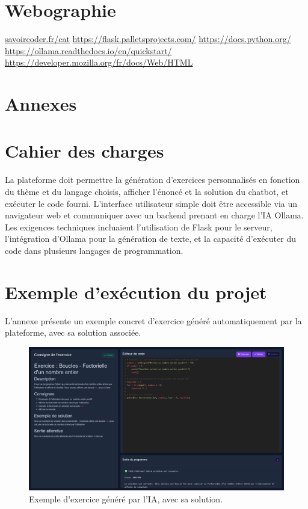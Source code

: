\documentclass[a4paper, 12pt, twoside]{article}
\begin{document}
\newpage
\section{Webographie}
\begin{thebibliography}{2}
 \url{savoircoder.fr/cat}
 \url{https://flask.palletsprojects.com/}
 \url{https://docs.python.org/}
 \url{https://ollama.readthedocs.io/en/quickstart/}
 \url{https://developer.mozilla.org/fr/docs/Web/HTML}
\end{thebibliography}

\newpage
\section{Annexes}
\appendix
\makeatletter
\def\@seccntformat#1{Annexe~\csname the#1\endcsname:\quad}
\makeatother

	\section{Cahier des charges}
La plateforme doit permettre la génération d'exercices personnalisés en fonction du thème et du langage choisis, afficher l'énoncé et la solution du chatbot, et exécuter le code fourni. L'interface utilisateur simple doit être accessible via un navigateur web et communiquer avec un backend prenant en charge l'IA Ollama. Les exigences techniques incluaient l'utilisation de Flask pour le serveur, l'intégration d'Ollama pour la génération de texte, et la capacité d'exécuter du code dans plusieurs langages de programmation.

	\section{Exemple d'exécution du projet}
L'annexe présente un exemple concret d'exercice généré automatiquement par la plateforme, avec sa solution associée. 

\begin{figure}[h!]
\centering
\includegraphics[width=1.3\textwidth]{exercice.png}
\caption{Exemple d'exercice généré par l'IA, avec sa solution.}
\label{fig:exercice}
\end{figure}
\end{document}
